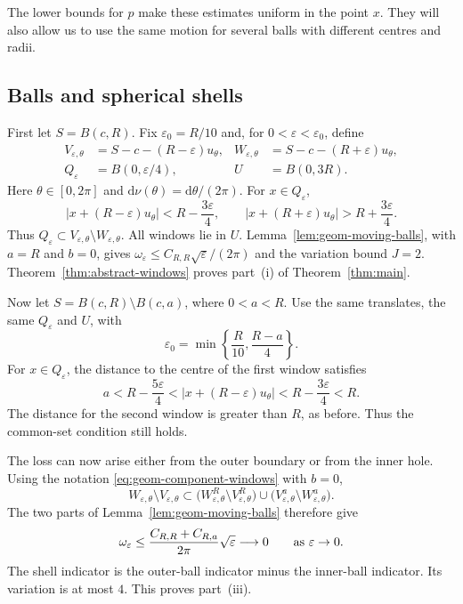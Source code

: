 \documentclass[12pt,reqno,tbtags]{amsart}
\def\d{\mathrm{d}}
\newcommand\1{\mathbbm{1}}
\newcommand{\eps}{\varepsilon}
\def\d{\mathrm{d}}
\begin{document}
The lower bounds for $p$ make these estimates uniform in the point $x$.
They will also allow us to use the same motion for several balls with
different centres and radii.

\subsection{Balls and spherical shells}\label{subsec:balls-shells}

First let $S=B(c,R)$. Fix $\eps_0=R/10$ and, for $0<\eps<\eps_0$, define
\begin{equation}\label{eq:geom-ball-windows}
    \begin{aligned}
        V_{\eps,\theta}&=S-c-(R-\eps)u_\theta,
        &W_{\eps,\theta}&=S-c-(R+\eps)u_\theta,\\
        Q_\eps&=B(0,\eps/4),
        &U&=B(0,3R).
    \end{aligned}
\end{equation}
Here $\theta\in[0,2\pi]$ and $\d\nu(\theta)=\d\theta/(2\pi)$.
For $x\in Q_\eps$,
\begin{equation*}
    |x+(R-\eps)u_\theta|<R-\frac{3\eps}{4},
    \qquad
    |x+(R+\eps)u_\theta|>R+\frac{3\eps}{4}.
\end{equation*}
Thus $Q_\eps\subset V_{\eps,\theta}\setminus W_{\eps,\theta}$.
All windows lie in $U$. Lemma~\ref{lem:geom-moving-balls}, with $a=R$ and
$b=0$, gives $\omega_\eps\le C_{R,R}\sqrt{\eps}/(2\pi)$ and the variation
bound $J=2$. Theorem~\ref{thm:abstract-windows} proves part~(i) of
Theorem~\ref{thm:main}.

Now let $S=B(c,R)\setminus B(c,a)$, where $0<a<R$. Use the same translates,
the same $Q_\eps$ and $U$, with
\begin{equation*}
    \eps_0=\min\left\{\frac R{10},\frac{R-a}{4}\right\}.
\end{equation*}
For $x\in Q_\eps$, the distance to the centre of the first window satisfies
\begin{equation*}
    a<R-\frac{5\eps}{4}
    <|x+(R-\eps)u_\theta|
    <R-\frac{3\eps}{4}<R.
\end{equation*}
The distance for the second window is greater than $R$, as before.
Thus the common-set condition still holds.

The loss can now arise either from the outer boundary or from the inner hole.
Using the notation \eqref{eq:geom-component-windows} with $b=0$,
\begin{equation}\label{eq:geom-shell-loss}
    W_{\eps,\theta}\setminus V_{\eps,\theta}
    \subset
    \bigl(W_{\eps,\theta}^{R}\setminus V_{\eps,\theta}^{R}\bigr)
    \cup
    \bigl(V_{\eps,\theta}^{a}\setminus W_{\eps,\theta}^{a}\bigr).
\end{equation}
The two parts of Lemma~\ref{lem:geom-moving-balls} therefore give
\begin{equation*}
    \omega_\eps
    \le\frac{C_{R,R}+C_{R,a}}{2\pi}\sqrt{\eps}
    \longrightarrow0\qquad{\rm{as}}\ \eps\to0.
\end{equation*}
The shell indicator is the outer-ball indicator minus the inner-ball
indicator. Its variation is at most $4$.
This proves part~(iii).
\end{document}
